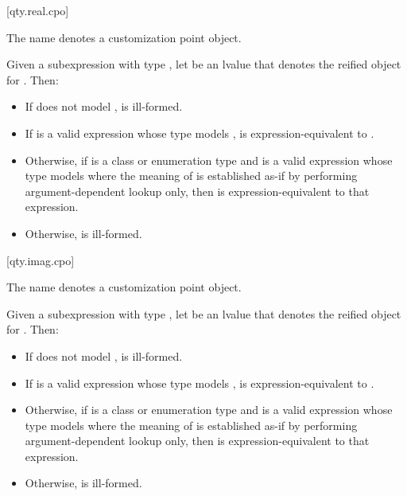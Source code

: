 [qty.real.cpo]{}

\pnum
The name  denotes a customization point object.

\pnum
Given a subexpression  with type ,
let  be an lvalue that denotes the reified object for .
Then:
\begin{itemize}
\item
If  does not model ,
 is ill-formed.
\item
If  is a valid expression whose type models ,
 is expression-equivalent to .
\item
Otherwise, if  is a class or enumeration type and
 is a valid expression whose type models 
where the meaning of  is established as-if by performing argument-dependent lookup only,
then  is expression-equivalent to that expression.
\item
Otherwise,  is ill-formed.
\end{itemize}

[qty.imag.cpo]{}

\pnum
The name  denotes a customization point object.

\pnum
Given a subexpression  with type ,
let  be an lvalue that denotes the reified object for .
Then:
\begin{itemize}
\item
If  does not model ,
 is ill-formed.
\item
If  is a valid expression whose type models ,
 is expression-equivalent to .
\item
Otherwise, if  is a class or enumeration type and
 is a valid expression whose type models 
where the meaning of  is established as-if by performing argument-dependent lookup only,
then  is expression-equivalent to that expression.
\item
Otherwise,  is ill-formed.
\end{itemize}

